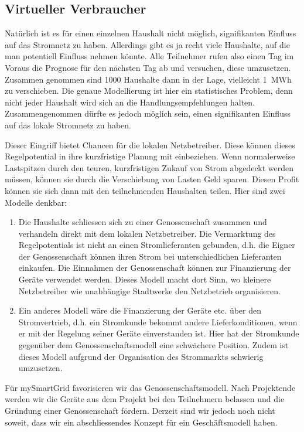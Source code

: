 \documentclass[12pt,BCOR=8.5mm]{scrartcl}
\begin{document}
\subsection{Virtueller Verbraucher}\label{sub:virtuellerverbraucher}
Natürlich ist es für einen einzelnen Haushalt nicht möglich,
signifikanten Einfluss auf das Stromnetz zu haben. Allerdings gibt es ja
recht viele Haushalte, auf die man potentiell Einfluss nehmen könnte.
Alle Teilnehmer rufen also einen Tag im Voraus die Prognose für den
nächsten Tag ab und versuchen, diese umzusetzen. Zusammen genommen sind
1000 Haushalte dann in der Lage, vielleicht 1~MWh zu verschieben.  Die
genaue Modellierung ist hier ein statistisches Problem, denn nicht jeder
Haushalt wird sich an die Handlungsempfehlungen halten. Zusammengenommen
dürfte es jedoch möglich sein, einen signifikanten Einfluss auf das
lokale Stromnetz zu haben.

Dieser Eingriff bietet Chancen für die lokalen Netzbetreiber. Diese
können dieses Regelpotential in ihre kurzfristige Planung mit
einbeziehen. Wenn normalerweise Lastspitzen durch den teuren,
kurzfristigen Zukauf von Strom abgedeckt werden müssen, können sie durch
die Verschiebung von Lasten Geld sparen. Diesen Profit können sie sich
dann mit den teilnehmenden Haushalten teilen. Hier sind zwei Modelle denkbar: 
\begin{enumerate}
  \item Die Haushalte schliessen sich zu einer Genossenschaft zusammen
    und verhandeln direkt mit dem lokalen Netzbetreiber. Die Vermarktung
    des Regelpotentials ist nicht an einen Stromlieferanten gebunden,
    d.h. die Eigner der Genossenschaft können ihren Strom bei
    unterschiedlichen Lieferanten einkaufen. Die Einnahmen der
    Genossenschaft können zur Finanzierung der Geräte verwendet werden.
    Dieses Modell macht dort Sinn, wo kleinere Netzbetreiber wie
    unabhängige Stadtwerke den Netzbetrieb organisieren.
  \item Ein anderes Modell wäre die Finanzierung der Geräte etc. über
    den Stromvertrieb, d.h. ein Stromkunde bekommt andere
    Lieferkonditionen, wenn er mit der Regelung seiner Geräte
    einverstanden ist. Hier hat der Stromkunde gegenüber dem
    Genossenschaftsmodell eine schwächere Position. Zudem ist dieses
    Modell aufgrund der Organisation des Strommarkts schwierig
    umzusetzen.
\end{enumerate}

Für mySmartGrid favorisieren wir das Genossenschaftsmodell. Nach
Projektende werden wir die Geräte aus dem Projekt bei den Teilnehmern
belassen und die Gründung einer Genossenschaft fördern. Derzeit sind wir
jedoch noch nicht soweit, dass wir ein abschliessendes Konzept für ein
Geschäftsmodell haben.
\end{document}
